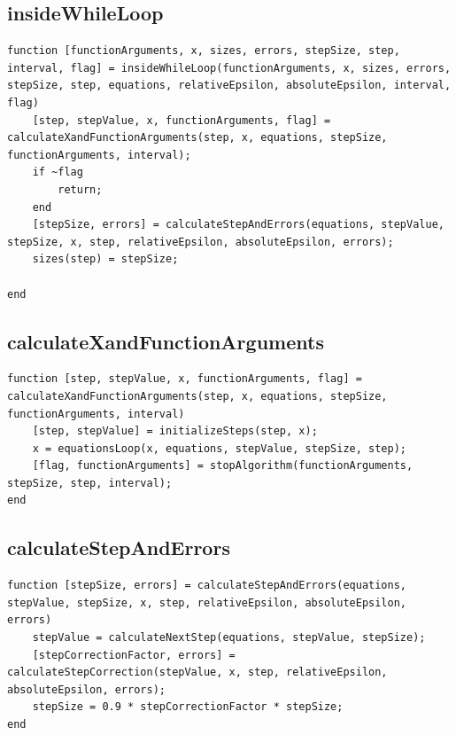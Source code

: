 \subsection{insideWhileLoop}
\begin{simplechar}
\begin{lstlisting}
function [functionArguments, x, sizes, errors, stepSize, step, interval, flag] = insideWhileLoop(functionArguments, x, sizes, errors, stepSize, step, equations, relativeEpsilon, absoluteEpsilon, interval, flag)
    [step, stepValue, x, functionArguments, flag] = calculateXandFunctionArguments(step, x, equations, stepSize, functionArguments, interval);
    if ~flag
        return;
    end
    [stepSize, errors] = calculateStepAndErrors(equations, stepValue, stepSize, x, step, relativeEpsilon, absoluteEpsilon, errors);
    sizes(step) = stepSize;

end
\end{lstlisting}
\end{simplechar}

\subsection{calculateXandFunctionArguments}
\begin{simplechar}
\begin{lstlisting}
function [step, stepValue, x, functionArguments, flag] = calculateXandFunctionArguments(step, x, equations, stepSize, functionArguments, interval)
    [step, stepValue] = initializeSteps(step, x);
    x = equationsLoop(x, equations, stepValue, stepSize, step);
    [flag, functionArguments] = stopAlgorithm(functionArguments, stepSize, step, interval);
end
\end{lstlisting}
\end{simplechar}

\subsection{calculateStepAndErrors}
\begin{simplechar}
\begin{lstlisting}
function [stepSize, errors] = calculateStepAndErrors(equations, stepValue, stepSize, x, step, relativeEpsilon, absoluteEpsilon, errors)
    stepValue = calculateNextStep(equations, stepValue, stepSize);
    [stepCorrectionFactor, errors] = calculateStepCorrection(stepValue, x, step, relativeEpsilon, absoluteEpsilon, errors);
    stepSize = 0.9 * stepCorrectionFactor * stepSize;
end
\end{lstlisting}
\end{simplechar}

